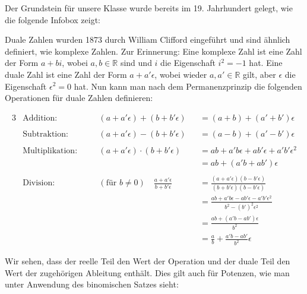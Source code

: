 \documentclass[
  a4paper,
  DIV=11]{scrreprt}
\theoremstyle{definition}
\theoremstyle{definition}
\theoremstyle{remark}
\begin{document}
Der Grundstein für unsere Klasse wurde bereits im 19. Jahrhundert
gelegt, wie die folgende Infobox zeigt:

\begin{tcolorbox}[enhanced jigsaw, titlerule=0mm, title=\textcolor{quarto-callout-note-color}{\faInfo}\hspace{0.5em}{Hintergrund: Duale Zahlen}, breakable, coltitle=black, leftrule=.75mm, bottomrule=.15mm, colback=white, rightrule=.15mm, opacitybacktitle=0.6, bottomtitle=1mm, toptitle=1mm, left=2mm, toprule=.15mm, colbacktitle=quarto-callout-note-color!10!white, colframe=quarto-callout-note-color-frame, arc=.35mm, opacityback=0]

Duale Zahlen wurden 1873 durch William Clifford eingeführt und sind
ähnlich definiert, wie komplexe Zahlen. Zur Erinnerung: Eine komplexe
Zahl ist eine Zahl der Form \(a + bi\), wobei \(a,b \in \mathbb{R}\)
sind und \(i\) die Eigenschaft \(i^2 = -1\) hat. Eine duale Zahl ist
eine Zahl der Form \(a + a'\epsilon\), wobei wieder
\(a,a' \in \mathbb{R}\) gilt, aber \(\epsilon\) die Eigenschaft
\(\epsilon^2 = 0\) hat. Nun kann man nach dem Permanenzprinzip die
folgenden Operationen für duale Zahlen definieren:

\begin{alignat*}{3}
    &\textrm{Addition:} && (a+a'\epsilon) + (b+b'\epsilon) &&= (a+b) + (a'+b')\epsilon \\ \\
    &\textrm{Subtraktion:} && (a+a'\epsilon) - (b+b'\epsilon) &&= (a-b) + (a'-b')\epsilon \\ \\
    &\textrm{Multiplikation:}\quad && (a+a'\epsilon) \cdot (b+b'\epsilon) &&= ab + a'b\epsilon + ab'\epsilon + a'b'\epsilon^2 \\
    & && &&= ab + (a'b + ab')\epsilon \\ \\
    &\textrm{Division:} && (\textrm{für }b\ne 0) \quad \frac{a+a'\epsilon}{b+b'\epsilon} &&= \frac{(a+a'\epsilon)(b-b'\epsilon)}{(b+b'\epsilon)(b-b'\epsilon)} \\
    & && &&= \frac{ab+a'b\epsilon-ab'\epsilon-a'b'\epsilon^2}{b^2 - (b')^2\epsilon^2} \\ 
    & && &&= \frac{ab + (a'b-ab')\epsilon}{b^2} \\ 
    & && &&= \frac{a}{b} + \frac{a'b - ab'}{b^2} \epsilon
\end{alignat*}

Wir sehen, dass der reelle Teil den Wert der Operation und der duale
Teil den Wert der zugehörigen Ableitung enthält. Dies gilt auch für
Potenzen, wie man unter Anwendung des binomischen Satzes sieht:


\end{tcolorbox}
\end{document}
